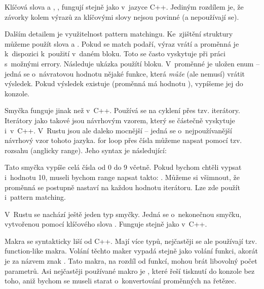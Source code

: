 \documentclass[main.tex]{subfiles}
\begin{document}

Klíčová slova  a , ,  fungují stejně
jako v~jazyce C++. Jediným rozdílem je, že závorky kolem výrazů za klíčovými slovy
nejsou povinné (a nepoužívají se).

Dalším detailem je využitelnost pattern matchingu. Ke~zjištění struktury můžeme použít
slova  a . Pokud se match podaří, výraz vrátí
 a proměnná je k~dispozici k~použití v~daném bloku. Toto se často vyskytuje
při práci s~možnými errory. Následuje ukázka použítí  bloku. V~proměnné
 je uložen enum  -- jedná se o~návratovou
hodnotu nějaké funkce, která \emph{může} (ale nemusí) vrátit výsledek. Pokud výsledek
existuje (proměnná má hodnotu ), vypíšeme jej do konzole.

\obrazek
{}


Smyčka  funguje jinak než v~C++. Používá se na cyklení přes tzv. iterátory.
Iterátory jako takové jsou návrhovým vzorem, který se částečně vyskytuje i~v~C++.
V~Rustu jsou ale daleko mocnější -- jedná se o~nejpoužívanější návrhový vzor tohoto
jazyka.  for loop přes čísla můžeme napsat pomocí tzv. rozsahu
(anglicky range). Jeho syntax je následující:

\obrazek
{}

Tato smyčka vypíše celá čísla od 0 do 9 včetně. Pokud bychom chtěli vypsat i~hodnotu 10,
museli bychom range napsat takto: . Můžeme si všimnout, že proměnná
 se postupně nastaví na každou hodnotu iterátoru. Lze zde použít i~pattern
matching.


V~Rustu se nachází ještě jeden typ smyčky. Jedná se o~nekonečnou smyčku, vytvořenou
pomocí klíčového slova . Funguje stejně jako  v~C++.


Makra se syntakticky liší od C++. Mají více typů, nejčastěji se ale používají tzv.
function-like makra. Volání těchto maker vypadá stejně jako volání funkci, akorát je za
názvem znak \irust{!}. Tato makra, na rozdíl od funkcí, mohou brát libovolný počet
parametrů. Asi nejčastěji používané makro je , které řeší tisknutí do
konzole bez toho, aniž bychom se museli starat o~konvertování proměnných na řetězec.
\end{document}
